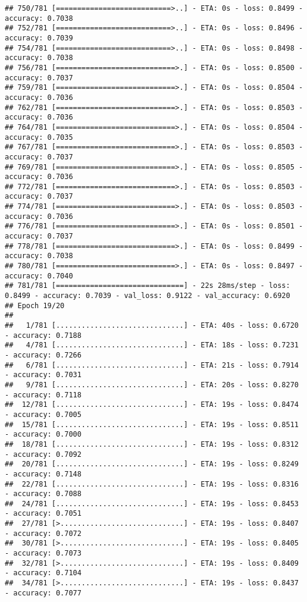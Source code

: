 \documentclass[
]{article}
\begin{document}
\begin{verbatim}
## 750/781 [===========================>..] - ETA: 0s - loss: 0.8499 - accuracy: 0.7038
## 752/781 [===========================>..] - ETA: 0s - loss: 0.8496 - accuracy: 0.7039
## 754/781 [===========================>..] - ETA: 0s - loss: 0.8498 - accuracy: 0.7038
## 756/781 [============================>.] - ETA: 0s - loss: 0.8500 - accuracy: 0.7037
## 759/781 [============================>.] - ETA: 0s - loss: 0.8504 - accuracy: 0.7036
## 762/781 [============================>.] - ETA: 0s - loss: 0.8503 - accuracy: 0.7036
## 764/781 [============================>.] - ETA: 0s - loss: 0.8504 - accuracy: 0.7035
## 767/781 [============================>.] - ETA: 0s - loss: 0.8503 - accuracy: 0.7037
## 769/781 [============================>.] - ETA: 0s - loss: 0.8505 - accuracy: 0.7036
## 772/781 [============================>.] - ETA: 0s - loss: 0.8503 - accuracy: 0.7037
## 774/781 [============================>.] - ETA: 0s - loss: 0.8503 - accuracy: 0.7036
## 776/781 [============================>.] - ETA: 0s - loss: 0.8501 - accuracy: 0.7037
## 778/781 [============================>.] - ETA: 0s - loss: 0.8499 - accuracy: 0.7038
## 780/781 [============================>.] - ETA: 0s - loss: 0.8497 - accuracy: 0.7040
## 781/781 [==============================] - 22s 28ms/step - loss: 0.8499 - accuracy: 0.7039 - val_loss: 0.9122 - val_accuracy: 0.6920
## Epoch 19/20
## 
##   1/781 [..............................] - ETA: 40s - loss: 0.6720 - accuracy: 0.7188
##   4/781 [..............................] - ETA: 18s - loss: 0.7231 - accuracy: 0.7266
##   6/781 [..............................] - ETA: 21s - loss: 0.7914 - accuracy: 0.7031
##   9/781 [..............................] - ETA: 20s - loss: 0.8270 - accuracy: 0.7118
##  12/781 [..............................] - ETA: 19s - loss: 0.8474 - accuracy: 0.7005
##  15/781 [..............................] - ETA: 19s - loss: 0.8511 - accuracy: 0.7000
##  18/781 [..............................] - ETA: 19s - loss: 0.8312 - accuracy: 0.7092
##  20/781 [..............................] - ETA: 19s - loss: 0.8249 - accuracy: 0.7148
##  22/781 [..............................] - ETA: 19s - loss: 0.8316 - accuracy: 0.7088
##  24/781 [..............................] - ETA: 19s - loss: 0.8453 - accuracy: 0.7051
##  27/781 [>.............................] - ETA: 19s - loss: 0.8407 - accuracy: 0.7072
##  30/781 [>.............................] - ETA: 19s - loss: 0.8405 - accuracy: 0.7073
##  32/781 [>.............................] - ETA: 19s - loss: 0.8409 - accuracy: 0.7104
##  34/781 [>.............................] - ETA: 19s - loss: 0.8437 - accuracy: 0.7077

\end{verbatim}
\end{document}
